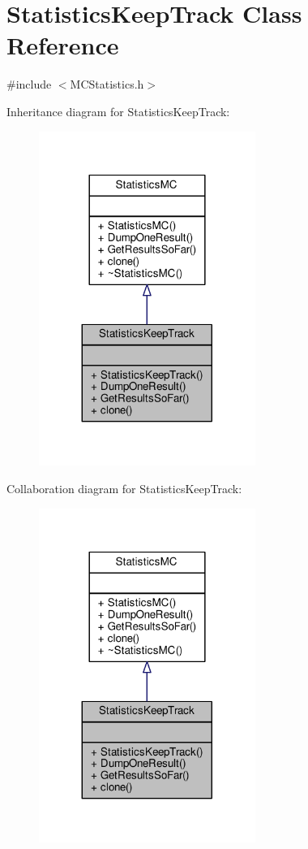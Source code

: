 \hypertarget{classStatisticsKeepTrack}{}\section{Statistics\+Keep\+Track Class Reference}
\label{classStatisticsKeepTrack}


{\ttfamily \#include $<$M\+C\+Statistics.\+h$>$}



Inheritance diagram for Statistics\+Keep\+Track\+:
\nopagebreak
\begin{figure}[H]
\begin{center}
\leavevmode
\includegraphics[width=200pt]{classStatisticsKeepTrack__inherit__graph}
\end{center}
\end{figure}


Collaboration diagram for Statistics\+Keep\+Track\+:
\nopagebreak
\begin{figure}[H]
\begin{center}
\leavevmode
\includegraphics[width=200pt]{classStatisticsKeepTrack__coll__graph}
\end{center}
\end{figure}
